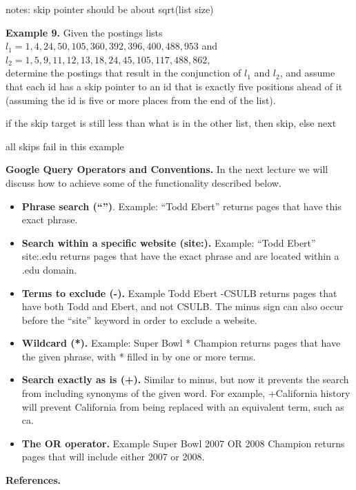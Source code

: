 \documentclass [12pt]{article}
\begin{document}
notes: skip pointer should be about sqrt(list size)

\textbf{Example 9.} Given the postings lists $l_{1} = 1,4,24,50,105,360,392,396,400,488,953$ and\\
$l_{2} = 1,5,9,11,12,13,18,24,45,105,117,488,862$,\\
determine the postings that result in the conjunction of $l_{1}$ and $l_{2}$, and assume that each id 
has a skip pointer to an id that is exactly five positions
ahead of it (assuming the id is five or more places from the end of the list). 

if the skip target is still less than what is in the other list, then skip, else next

all skips fail in this example


\newpage
\textbf{Google Query Operators and Conventions.} In the next 
lecture we will discuss how to achieve some of the functionality described below.

\begin{itemize}
\item \textbf{Phrase search (``'')}. Example: ``Todd Ebert'' returns pages that have this exact phrase.
\item \textbf{Search within a specific website (site:).} Example: ``Todd Ebert'' site:.edu returns pages that
have the exact phrase and are located within a .edu domain.
\item \textbf{Terms to exclude (-).} Example Todd Ebert -CSULB returns pages that have both Todd and Ebert, and 
not CSULB. The minus sign can also occur before the ``site'' keyword in order to exclude a website.
\item \textbf{Wildcard (*).} Example: Super Bowl * Champion returns pages that have the given phrase, with * filled in
by one or more terms.
\item \textbf{Search exactly as is (+).} Similar to minus, but now it prevents the search from including synonyms
of the given word. For example, +California history will prevent California from being replaced with an equivalent term,
such as ca.
\item \textbf{The OR operator.} Example Super Bowl 2007 OR 2008 Champion returns pages that will include either 2007 or
2008.
\end{itemize}

\newpage
\noindent
\textbf{References.}
\end{document}
